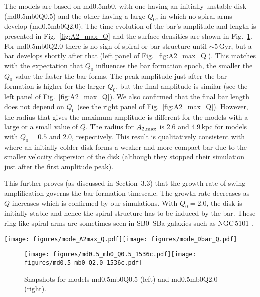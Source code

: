 The models are based on md0.5mb0, with one having an initially unstable disk
(md0.5mb0Q0.5) and 
the other having a large $Q_0$, in which no spiral arms develop (md0.5mb0Q2.0).
The time evolution of the bar's amplitude and length is presented in
Fig.~\ref{fig:A2_max_Q} 
and the surface densities are shown in Fig.~\ref{fig:snapshots_Q}.
For md0.5mb0Q2.0 there is no sign of spiral or bar structure until $\sim 5$\,Gyr, but 
a bar develops shortly after that (left panel of Fig.~\ref{fig:A2_max_Q}).
This matches with the 
expectation that $Q_0$ influences the bar formation epoch,
the smaller the $Q_0$ value the faster the bar forms.
The peak amplitude just after the bar formation is higher for
the larger $Q_0$, but the final amplitude is similar
(see the left panel of Fig.~\ref{fig:A2_max_Q}).
We also confirmed that the final bar length does not depend on $Q_0$
(see the right panel of Fig.~\ref{fig:A2_max_Q}). 
However, the radius that gives the maximum amplitude is different for 
the models with a large or a small value of $Q$.
The radius for $A_{\rm 2, max}$ is 2.6 and 4.9\,kpc for models with $Q_0=0.5$
and $2.0$, respectively. This result is qualitatively consistent with 
\citet{2012PASJ...64....5H} where an initially colder disk forms
a weaker and more compact bar due to the smaller velocity dispersion of the disk
(although they stopped their simulation just after the first amplitude peak).

This further proves (as discussed in Section~3.3) that the growth 
rate of swing amplification governs the bar formation timescale.
The growth rate decreases 
as $Q$ increases \citep{1981seng.proc..111T} which is confirmed by our simulations. 
With $Q_0=2.0$, the disk is initially stable and hence the spiral structure has 
to be induced by the bar. These ring-like spiral arms are sometimes seen in SB0--SBa 
galaxies such as NGC\,5101 \citep{2011ApJS..197...21H}.


\begin{figure*}
\texttt{[image: figures/mode\_A2max\_Q.pdf]}\texttt{[image: figures/mode\_Dbar\_Q.pdf]}
\caption{Same as Fig.~\ref{fig:A2_max_mdisk}, but for models md0.5mb0Q0.5 and md0.5mb0Q2.0.
\label{fig:A2_max_Q}}
\end{figure*}


\begin{figure}
\begin{center}
\texttt{[image: figures/md0.5\_mb0\_Q0.5\_1536c.pdf]}\texttt{[image: figures/md0.5\_mb0\_Q2.0\_1536c.pdf]}\\
    \caption{Snapshots for models md0.5mb0Q0.5 (left) and md0.5mb0Q2.0 (right).\label{fig:snapshots_Q}}
\end{center}
\end{figure}

